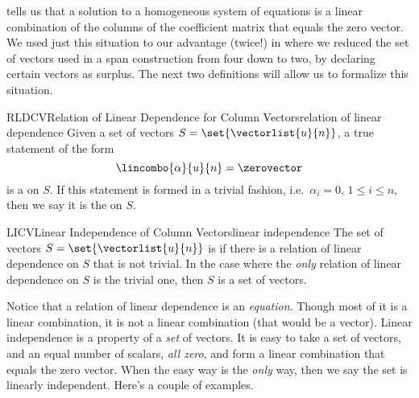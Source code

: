 %
%
 tells us that a solution to a homogeneous system of equations is a linear combination of the columns of the coefficient matrix that equals the zero vector.  We used just this situation to our advantage (twice!) in  where we reduced the set of vectors used in a span construction from four down to two, by declaring certain vectors as surplus.  The next two definitions will allow us to formalize this situation.
%
%
\begin{definition}{RLDCV}{Relation of Linear Dependence for Column Vectors}{relation  of linear dependence}
Given a set of vectors $S=\set{\vectorlist{u}{n}}$, a true statement of the form
%
\begin{equation*}
\lincombo{\alpha}{u}{n}=\zerovector
\end{equation*}
%
is a  on $S$.  If this statement is formed in a trivial fashion, i.e.\ $\alpha_i=0$, $1\leq i\leq n$, then we say it is the  on $S$.
%
\end{definition}
%
%
\begin{definition}{LICV}{Linear Independence of Column Vectors}{linear independence}
The set of vectors $S=\set{\vectorlist{u}{n}}$ is  if there is a relation of linear dependence on $S$ that is not trivial.  In the case where the {\em only} relation of linear dependence on $S$ is the trivial one, then $S$ is a  set of vectors.
\end{definition}
%
Notice that a relation of linear dependence is an {\em equation}.  Though most of it is a linear combination, it is not a linear combination (that would be a vector).  Linear independence is a property of a {\em set} of vectors.  It is easy to take a set of vectors, and an equal number of scalars, {\em all zero}, and form a linear combination that equals the zero vector.  When the easy way is the {\em only} way, then we say the set is linearly independent.  Here's a couple of examples.
